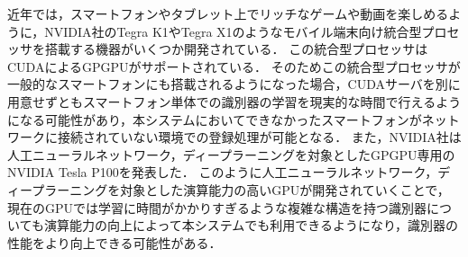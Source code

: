 近年では，スマートフォンやタブレット上でリッチなゲームや動画を楽しめるように，NVIDIA社のTegra K1やTegra X1のようなモバイル端末向け統合型プロセッサを搭載する機器がいくつか開発されている．
この統合型プロセッサはCUDAによるGPGPUがサポートされている．
そのためこの統合型プロセッサが一般的なスマートフォンにも搭載されるようになった場合，CUDAサーバを別に用意せずともスマートフォン単体での識別器の学習を現実的な時間で行えるようになる可能性があり，本システムにおいてできなかったスマートフォンがネットワークに接続されていない環境での登録処理が可能となる．
また，NVIDIA社は人工ニューラルネットワーク，ディープラーニングを対象としたGPGPU専用のNVIDIA Tesla P100を発表した．
このように人工ニューラルネットワーク，ディープラーニングを対象とした演算能力の高いGPUが開発されていくことで，現在のGPUでは学習に時間がかかりすぎるような複雑な構造を持つ識別器についても演算能力の向上によって本システムでも利用できるようになり，識別器の性能をより向上できる可能性がある．
